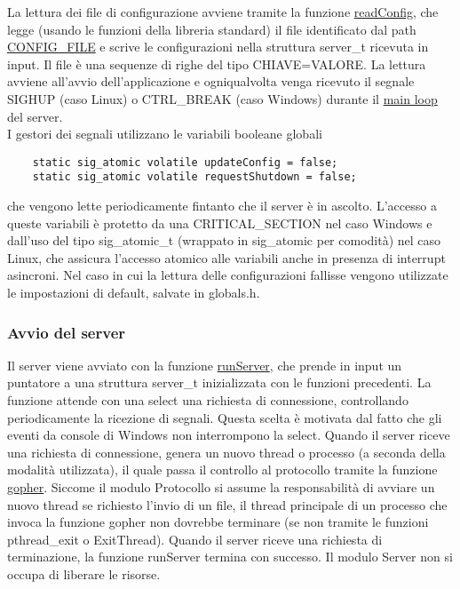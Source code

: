 \documentclass{article}
\begin{document}
La lettura dei file di configurazione avviene tramite la funzione \href{html/server_8c.html#a2e07cc3959eab913ab4c894bc6c8395d}
{readConfig}, che legge (usando le funzioni della libreria standard) il file identificato 
dal path \href{}{CONFIG\_FILE} e scrive le configurazioni nella struttura server\_t ricevuta in input.
Il file è una sequenze di righe del tipo CHIAVE=VALORE.
La lettura avviene all'avvio dell'applicazione e ogniqualvolta venga ricevuto il segnale 
SIGHUP (caso Linux) o CTRL\_BREAK (caso Windows) durante il \href{html/server_8h.html#a533c9a4292e9d1106ff7c54fbf75090a}
{main loop} del server.\\
I gestori dei segnali utilizzano le variabili booleane globali
\begin{lstlisting}
    static sig_atomic volatile updateConfig = false;
    static sig_atomic volatile requestShutdown = false;
\end{lstlisting}
che vengono lette periodicamente fintanto che il server è in ascolto. L'accesso a queste variabili è 
protetto da una CRITICAL\_SECTION nel caso Windows e dall'uso del tipo sig\_atomic\_t (wrappato in sig\_atomic per comodità)
nel caso Linux, che assicura l'accesso atomico alle variabili anche in presenza di interrupt asincroni.
Nel caso in cui la lettura delle configurazioni fallisse vengono utilizzate le 
impostazioni di default, salvate in globals.h.

\subsubsection{Avvio del server}

Il server viene avviato con la funzione \href{}{runServer},
che prende in input un puntatore a una struttura server\_t inizializzata con le funzioni precedenti.
La funzione attende con una select una richiesta di connessione, controllando periodicamente la ricezione
di segnali. Questa scelta è motivata dal fatto che gli eventi da console di Windows non interrompono la select.
Quando il server riceve una richiesta di connessione, genera un nuovo thread o processo (a seconda della modalità
utilizzata), il quale passa il controllo al protocollo tramite la funzione \href{}
{gopher}. Siccome il modulo Protocollo si assume la responsabilità di avviare un nuovo thread se richiesto
l'invio di un file, il thread principale di un processo che invoca la funzione gopher non dovrebbe terminare
(se non tramite le funzioni pthread\_exit o ExitThread). Quando il server riceve una richiesta di terminazione, 
la funzione runServer termina con successo. Il modulo Server non si occupa di liberare le risorse.
\end{document}
